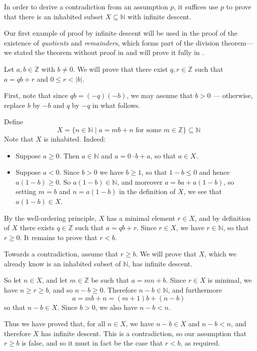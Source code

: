 \begin{strategy}
\label{strInfiniteDescent}
In order to derive a contradiction from an assumption $p$, it suffices use $p$ to prove that there is an inhabited subset $X \subseteq \mathbb{N}$ with infinite descent.
\end{strategy}

Our first example of proof by infinite descent will be used in the proof of the existence of \textit{quotients} and \textit{remainders}, which forms part of the division theorem---we stated the theorem without proof in  and will prove it fully in .

\begin{example}
\label{exQuotientRemainderExistence}
Let $a,b \in \mathbb{Z}$ with $b \ne 0$. We will prove that there exist $q,r \in \mathbb{Z}$ such that $a=qb+r$ and $0 \le r < |b|$.

First, note that since $qb = (-q)(-b)$, we may assume that $b>0$ --- otherwise, replace $b$ by $-b$ and $q$ by $-q$ in what follows.

Define
\[ X = \{ n \in \mathbb{N} \mid a = mb + n \text{ for some } m \in \mathbb{Z} \} \subseteq \mathbb{N} \]
Note that $X$ is inhabited. Indeed:
\begin{itemize}
\item Suppose $a \ge 0$. Then $a \in \mathbb{N}$ and $a = 0 \cdot b + a$, so that $a \in X$.
\item Suppose $a < 0$. Since $b>0$ we have $b \ge 1$, so that $1-b \le 0$ and hence $a(1-b) \ge 0$. So $a(1-b) \in \mathbb{N}$, and moreover $a = ba + a(1-b)$, so setting $m=b$ and $n=a(1-b)$ in the definition of $X$, we see that $a(1-b) \in X$.
\end{itemize}
By the well-ordering principle, $X$ has a minimal element $r \in X$, and by definition of $X$ there exists $q \in \mathbb{Z}$ such that $a=qb+r$. Since $r \in X$, we have $r \in \mathbb{N}$, so that $r \ge 0$. It remains to prove that $r<b$.

Towards a contradiction, assume that $r \ge b$. We will prove that $X$, which we already know is an inhabited subset of $\mathbb{N}$, has infinite descent.

So let $n \in X$, and let $m \in \mathbb{Z}$ be such that $a=mn+b$. Since $r \in X$ is minimal, we have $n \ge r \ge b$, and so $n-b \ge 0$. Therefore $n-b \in \mathbb{N}$, and furthermore
\[ a = mb + n = (m+1)b + (n-b) \]
so that $n-b \in X$. Since $b>0$, we also have $n-b < n$.

Thus we have proved that, for all $n \in X$, we have $n-b \in X$ and $n-b < n$, and therefore $X$ has infinite descent. This is a contradiction, so our assumption that $r \ge b$ is false, and so it must in fact be the case that $r<b$, as required.
\end{example}

